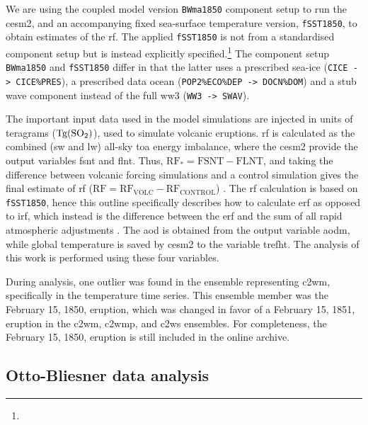 \documentclass{ametsocV6.1}
\newcommand{\iso}[1][i]{{#1}njected \ce{SO2}}
\begin{document}
We are using the coupled model version \texttt{BWma1850} component setup to run the
\gls{cesm2}, and an accompanying fixed sea-surface temperature version,
\texttt{fSST1850}, to obtain estimates of the \gls{rf}. The applied \texttt{fSST1850} is
not from a standardised component setup but is instead explicitly
specified.\footnote{\fssturl} The component setup \texttt{BWma1850} and
\texttt{fSST1850} differ in that the latter uses a prescribed sea-ice (\texttt{CICE ->
  CICE\%PRES}), a prescribed data ocean (\texttt{POP2\%ECO\%DEP -> DOCN\%DOM}) and a stub
wave component instead of the full \gls{ww3} (\texttt{WW3 -> SWAV}).

The important input data used in the model simulations are \iso{} in units of teragrams
(\(\si{\tera\gram(\ce{SO2})}\)), used to simulate volcanic eruptions. \gls{rf} is
calculated as the combined (\gls{sw} and \gls{lw}) all-sky \gls{toa} energy imbalance,
where the \gls{cesm2} provide the output variables \gls{fsnt} and \gls{flnt}. Thus,
\(\mathrm{RF_*}= \mathrm{FSNT} - \mathrm{FLNT}\), and taking the difference between
volcanic forcing simulations and a control simulation gives the final estimate of
\gls{rf} (\(\mathrm{RF}=\mathrm{RF_{VOLC}}-\mathrm{RF_{CONTROL}}\))
\citep{marshall2020}. The \gls{rf} calculation is based on \texttt{fSST1850}, hence this
outline specifically describes how to calculate \gls{erf} as opposed to \gls{irf}, which
instead is the difference between the \gls{erf} and the sum of all rapid atmospheric
adjustments \citep{marshall2020,smith2018}. The \gls{aod} is obtained from the output
variable \gls{aodm}, while global temperature is saved by \gls{cesm2} to the variable
\gls{trefht}. The analysis of this work is performed using these four variables.

During analysis, one outlier was found in the ensemble representing \gls{c2wm},
specifically in the temperature time series. This ensemble member was the February 15,
1850, eruption, which was changed in favor of a February 15, 1851, eruption in the
\gls{c2wm}, \gls{c2wmp}, and \gls{c2ws} ensembles. For completeness, the February 15,
1850, eruption is still included in the online archive.

\appendix[B]


\subsection{Otto-Bliesner data analysis}\label{ap:ob16}
\end{document}

